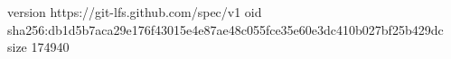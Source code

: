 version https://git-lfs.github.com/spec/v1
oid sha256:db1d5b7aca29e176f43015e4e87ae48c055fce35e60e3dc410b027bf25b429dc
size 174940

